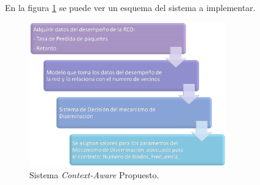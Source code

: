 En la figura \ref{fig:fig1} se puede ver un esquema del sistema a implementar.


\begin{figure}[ht]
\center
\includegraphics[width=8.5cm]{Diagrama.png}
\caption{Sistema \textit{Context-Aware} Propuesto.}
\label{fig:fig1}
\end{figure}











